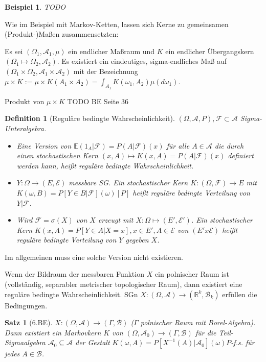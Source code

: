 \documentclass[]{article}
\newtheorem{theorem}{Satz}
\newtheorem{definition}{Definition}
\newtheorem*{example}{Beispiel}
\begin{document}
\begin{example}
	TODO
\end{example}

Wie im Beispiel mit Markov-Ketten, lassen sich Kerne zu gemeinsamen (Produkt-)Maßen zusammensetzten:

Es sei $(\Omega_1, \mathcal{A}_1, \mu)$ ein endlicher Maßraum und $K$ ein endlicher Übergangskern $(\Omega_1 \mapsto \Omega_2, \mathcal{A}_2)$. Es existiert ein eindeutiges, sigma-endliches Maß auf $(\Omega_1 \times \Omega_2, \mathcal{A}_1 \times \mathcal{A}_2)$ mit der Bezeichnung $\mu \times K := \mu\times K(A_1 \times A_2) = \int_{A_1} K(\omega_1, A_2) \mu(d\omega_1)$.

Produkt von $\mu\times K$
TODO BE Seite 36

\begin{definition}[Reguläre bedingte Wahrscheinlichkeit]
	$(\Omega, \mathcal{A}, P), \mathcal{F}\subset \mathcal{A}$ Sigma-Unteralgebra.
	\begin{itemize}
		\item Eine Version von $\mathbb{E}(1_A|\mathcal{F})= P(A|\mathcal{F})(x)$ für alle $A\in \mathcal{A}$ die durch einen stochastischen Kern $(x,A)\mapsto K(x,A)=P(A|\mathcal{F})(x)$ definiert werden kann, heißt reguläre bedingte Wahrscheinlichkeit.
		\item $Y:\Omega\rightarrow (E, \mathcal{E})$ messbare SG. Ein stochastischer Kern $K:(\Omega, \mathcal{F})\rightarrow E$ mit $K(\omega, B) = P[Y\in B | \mathcal{F}](\omega) [P]$ heißt reguläre bedingte Verteilung von $Y|\mathcal{F}$.
		\item Wird $\mathcal{F}=\sigma(X)$ von $X$ erzeugt mit $X:\Omega\mapsto(E', \mathcal{E}')$. Ein stochastischer Kern $K(x,A)=P[Y\in A | X=x], x\in E', A\in \mathcal{E}$ von $(E'x\mathcal{E})$ heißt reguläre bedingte Verteilung von $Y$ gegeben $X$.
	\end{itemize}
\end{definition}

Im allgemeinen muss eine solche Version nicht existieren.

Wenn der Bildraum der messbaren Funktion $X$ ein polnischer Raum ist (vollständig, separabler metrischer topologischer Raum), dann existiert eine reguläre bedingte Wahrscheinlichkeit. SGn $X:(\Omega, \mathcal{A})\rightarrow(\mathbb{R}^k, \mathcal{B}_k)$ erfüllen die Bedingungen.

\begin{theorem}[6.BE]
	$X:(\Omega, \mathcal{A})\rightarrow(\Gamma, \mathcal{B})$ ($\Gamma$ polnischer Raum mit Borel-Algebra). Dann existiert ein Markovkern $K$ von $(\Omega, \mathcal{A}_0)\rightarrow(\Gamma, \mathcal{B})$ für die Teil-Sigmaalgebra $\mathcal{A}_0\subseteq \mathcal{A}$ der Gestalt $K(\omega, A)=P[X^{-1}(A)|\mathcal{A}_0](\omega) P$-f.s. für jedes $A\in\mathcal{B}$.
\end{theorem}
\end{document}
